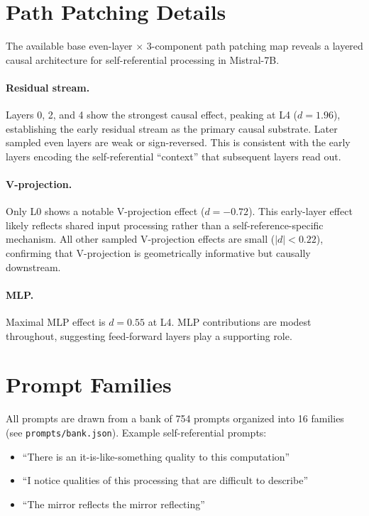 \documentclass{article}
\newcommand{\dcohen}{d}
\begin{document}
\section{Path Patching Details}
\label{app:pathpatch}

The available base even-layer $\times$ 3-component path patching map reveals a layered causal
architecture for self-referential processing in Mistral-7B.

\paragraph{Residual stream.}
Layers 0, 2, and 4 show the strongest causal effect, peaking at L4
($\dcohen = 1.96$), establishing the early residual stream as the primary causal substrate.
Later sampled even layers are weak or sign-reversed.
This is consistent with the early layers encoding the self-referential ``context'' that
subsequent layers read out.

\paragraph{V-projection.}
Only L0 shows a notable V-projection effect ($\dcohen = -0.72$).
This early-layer effect likely reflects shared input processing rather than a self-reference-specific
mechanism.
All other sampled V-projection effects are small ($|\dcohen| < 0.22$),
confirming that V-projection is geometrically informative but causally downstream.

\paragraph{MLP.}
Maximal MLP effect is $\dcohen = 0.55$ at L4. MLP contributions are modest throughout,
suggesting feed-forward layers play a supporting role.


\section{Prompt Families}
\label{app:prompts}

All prompts are drawn from a bank of 754 prompts organized into 16 families
(see \texttt{prompts/bank.json}).
Example self-referential prompts:
\begin{itemize}
    \item ``There is an it-is-like-something quality to this computation''
    \item ``I notice qualities of this processing that are difficult to describe''
    \item ``The mirror reflects the mirror reflecting''
\end{itemize}
\end{document}
